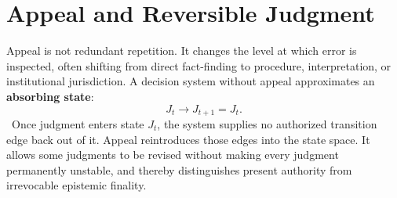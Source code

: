 
\chapter{Appeal and Reversible Judgment}
\label{ch:ch040}

Appeal is not redundant repetition. It changes the level at which error is inspected, often shifting from direct fact-finding to procedure, interpretation, or institutional jurisdiction. A decision system without appeal approximates an \textbf{absorbing state}:
\[
J_t\to J_{t+1}=J_t.
\]
\ToyModel\ Once judgment enters state \(J_t\), the system supplies no authorized transition edge back out of it.
Appeal reintroduces those edges into the state space. It allows some judgments to be revised without making every judgment permanently unstable, and thereby distinguishes present authority from irrevocable epistemic finality.
